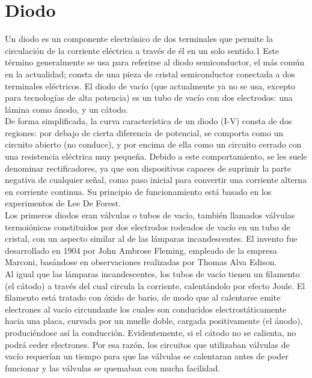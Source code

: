 \section{Diodo}

Un diodo es un componente electrónico de dos terminales que permite la circulación de la corriente eléctrica a través de él en un solo sentido.1​ Este término generalmente se usa para referirse al diodo semiconductor, el más común en la actualidad; consta de una pieza de cristal semiconductor conectada a dos terminales eléctricos. El diodo de vacío (que actualmente ya no se usa, excepto para tecnologías de alta potencia) es un tubo de vacío con dos electrodos: una lámina como ánodo, y un cátodo.\citep{diodoWiki}\\

De forma simplificada, la curva característica de un diodo (I-V) consta de dos regiones: por debajo de cierta diferencia de potencial, se comporta como un circuito abierto (no conduce), y por encima de ella como un circuito cerrado con una resistencia eléctrica muy pequeña. Debido a este comportamiento, se les suele denominar rectificadores, ya que son dispositivos capaces de suprimir la parte negativa de cualquier señal, como paso inicial para convertir una corriente alterna en corriente continua. Su principio de funcionamiento está basado en los experimentos de Lee De Forest.\citep{diodoWiki}\\


Los primeros diodos eran válvulas o tubos de vacío, también llamados válvulas termoiónicas constituidos por dos electrodos rodeados de vacío en un tubo de cristal, con un aspecto similar al de las lámparas incandescentes. El invento fue desarrollado en 1904 por John Ambrose Fleming, empleado de la empresa Marconi, basándose en observaciones realizadas por Thomas Alva Edison.\citep{diodoWiki}\\


Al igual que las lámparas incandescentes, los tubos de vacío tienen un filamento (el cátodo) a través del cual circula la corriente, calentándolo por efecto Joule. El filamento está tratado con óxido de bario, de modo que al calentarse emite electrones al vacío circundante los cuales son conducidos electrostáticamente hacia una placa, curvada por un muelle doble, cargada positivamente (el ánodo), produciéndose así la conducción. Evidentemente, si el cátodo no se calienta, no podrá ceder electrones. Por esa razón, los circuitos que utilizaban válvulas de vacío requerían un tiempo para que las válvulas se calentaran antes de poder funcionar y las válvulas se quemaban con mucha facilidad.\citep{diodoWiki}\\


